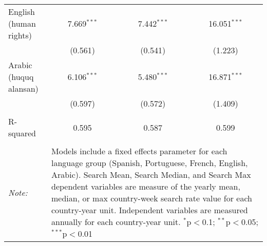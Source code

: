 \begin{table}[!htbp]
\begin{tabular}{@{\extracolsep{5pt}}lccc}
  English (human rights) & 7.669$^{***}$ & 7.442$^{***}$ & 16.051$^{***}$ \\ 
  & (0.561) & (0.541) & (1.223) \\ 
  Arabic (huquq alansan) & 6.106$^{***}$ & 5.480$^{***}$ & 16.871$^{***}$ \\ 
  & (0.597) & (0.572) & (1.409) \\ 
 \hline \\[-1.8ex] 
R-squared  & 0.595 & 0.587 & 0.599 \\ 
\hline 
\hline \\[-1.8ex] 
\textit{Note:}  & \multicolumn{3}{l}{\parbox[t]{8cm}{Models include a fixed effects parameter for each language group (Spanish, Portuguese, French, English, Arabic). Search Mean, Search Median, and Search Max dependent variables are measure of the yearly mean, median, or max country-week search rate value for each country-year unit. Independent variables are measured annually for each country-year unit. $^{*}$p$<$0.1; $^{**}$p$<$0.05; $^{***}$p$<$0.01}} \\ 
\end{tabular} 
\end{table} 
